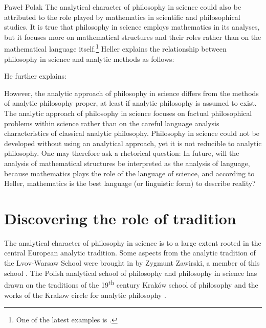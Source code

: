 \begin{artengenv}{Paweł Polak}
The analytical character of philosophy in science could also be attributed to the role played by mathematics in
scientific and philosophical studies. It is true that philosophy in science employs mathematics in its analyses, but it
focuses more on mathematical structures and their roles rather than on the mathematical language itself.\footnote{One
of the latest examples is
\parencite{pol_heller_category_2016}.
} Heller explains the relationship between
philosophy in science and analytic methods as follows:

He further explains:



However, the analytic approach of philosophy in science differs from the methods of analytic philosophy proper, at least
if analytic philosophy is assumed to exist. The analytic approach of philosophy in science focuses on factual
philosophical problems within science rather than on the careful language analysis characteristics of classical
analytic philosophy. Philosophy in science could not be developed without using an analytical approach, yet it is not
reducible to analytic philosophy. One may therefore ask a rhetorical question: In future, will the analysis of
mathematical structures be interpreted as the analysis of language, because mathematics plays the role of the language
of science, and according to Heller, mathematics is the best language (or linguistic form) to describe reality?

\section{Discovering the role of tradition}
The analytical character of philosophy in science is to a large extent rooted in the central European analytic
tradition. Some aspects from the analytic tradition of the Lvov-Warsaw School were brought in by Zygmunt Zawirski, a
member of this school
\parencite{pol_jadacki_polish_2009}.
The Polish analytical school of philosophy and philosophy in science has
drawn on the traditions of the 19\textsuperscript{th} century Kraków school of philosophy
\parencite{pol_polak_19th_2011}
and the works
of the Krakow circle for analytic philosophy
\parencite{pol_wolak_naukowa_2005-1}.


\end{artengenv}
